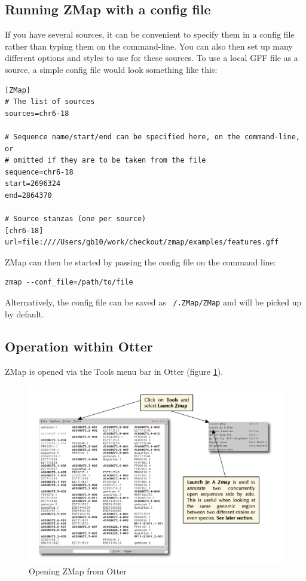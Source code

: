 \documentclass[letterpaper]{article}
\begin{document}
\subsection{Running ZMap with a config file}
If you have several sources, it can be convenient to specify them in a config file rather than typing them on the command-line. You can also then set up many different options and styles to use for these sources. To use a local GFF file as a source, a simple config file would look something like this:
\begin{verbatim}
[ZMap]
# The list of sources
sources=chr6-18

# Sequence name/start/end can be specified here, on the command-line, or
# omitted if they are to be taken from the file
sequence=chr6-18
start=2696324
end=2864370

# Source stanzas (one per source)
[chr6-18]
url=file:////Users/gb10/work/checkout/zmap/examples/features.gff
\end{verbatim}

ZMap can then be started by passing the config file on the command line:
\begin{verbatim}
zmap --conf_file=/path/to/file
\end{verbatim}

Alternatively, the config file can be saved as \texttt{~/.ZMap/ZMap} and will be picked up by default.

\subsection{Operation within Otter}
ZMap is opened via the Tools menu bar in Otter (figure \ref{img_open_from_otterlace}).

\begin{figure}
\centering
\color[rgb]{0.30980393,0.5058824,0.7411765}
\includegraphics[width=15.231cm]{img_open_from_otterlace.png}
\caption{Opening ZMap from Otter}
\label{img_open_from_otterlace}
\end{figure}
\end{document}
